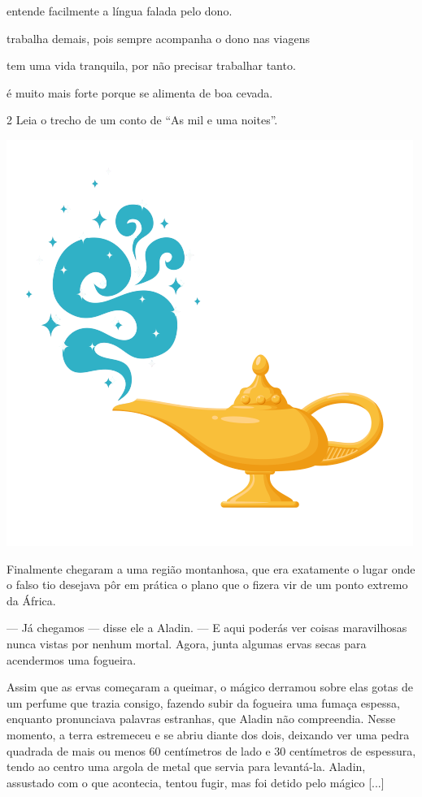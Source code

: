 \begin{escolha}
\item entende facilmente a língua falada pelo dono.

\item trabalha demais, pois sempre acompanha o dono nas viagens

\item tem uma vida tranquila, por não precisar trabalhar tanto.

\item é muito mais forte porque se alimenta de boa cevada.
\end{escolha}

\num{2} Leia o trecho de um conto de ``As mil e uma noites''.

\begin{myquote}
\textit{}

\begin{center}
\includegraphics[width=.4\textwidth]{media/image51.png}
\end{center}

Finalmente chegaram a uma região montanhosa, que era
exatamente o lugar onde o falso tio desejava pôr em prática o plano que
o fizera vir de um ponto extremo da África.

--- Já chegamos --- disse ele a Aladin. --- E aqui poderás ver coisas
maravilhosas nunca vistas por nenhum mortal. Agora, junta algumas ervas
secas para acendermos uma fogueira.

Assim que as ervas começaram a queimar, o mágico derramou sobre elas
gotas de um perfume que trazia consigo, fazendo subir da fogueira uma
fumaça espessa, enquanto pronunciava palavras estranhas, que Aladin não
compreendia. Nesse momento, a terra estremeceu e se abriu diante dos
dois, deixando ver uma pedra quadrada de mais ou menos 60 centímetros de
lado e 30 centímetros de espessura, tendo ao centro uma argola de metal
que servia para levantá-la. Aladin, assustado com o que acontecia,
tentou fugir, mas foi detido pelo mágico [...]



\end{myquote}
